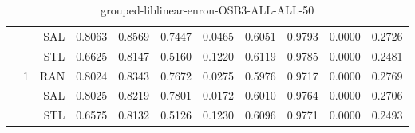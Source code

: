 \begin{center}
\begin{table}[htbp]
\begin{center}
\begin{tabular}{ | r | r | r | r | r | r | r | r | r | r | r |}
 &   & SAL & 0.8063 & 0.8569 & 0.7447 & 0.0465 & 0.6051 & 0.9793 & 0.0000 & 0.2726\\ \cline{3-11}
 &   & STL & 0.6625 & 0.8147 & 0.5160 & 0.1220 & 0.6119 & 0.9785 & 0.0000 & 0.2481\\ \cline{2-11}
 & \multirow{3}{*}{1} & RAN & 0.8024 & 0.8343 & 0.7672 & 0.0275 & 0.5976 & 0.9717 & 0.0000 & 0.2769\\ \cline{3-11}
 &   & SAL & 0.8025 & 0.8219 & 0.7801 & 0.0172 & 0.6010 & 0.9764 & 0.0000 & 0.2706\\ \cline{3-11}
 &   & STL & 0.6575 & 0.8132 & 0.5126 & 0.1230 & 0.6096 & 0.9771 & 0.0000 & 0.2493\\ \cline{2-11}
\hline
\end{tabular}
\caption{grouped-liblinear-enron-OSB3-ALL-ALL-50}
\end{center}
 \end{table}
\end{center}

